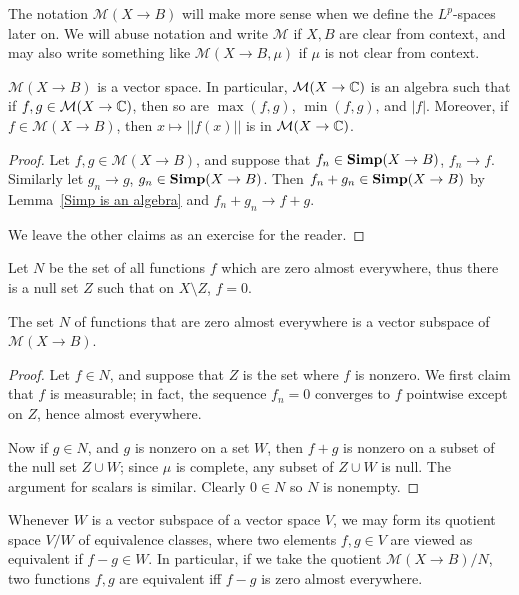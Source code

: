\begin{subsec}
The notation $\mathcal M(X \to B)$ will make more sense when we define the $L^p$-spaces later on.
We will abuse notation and write $\mathcal M$ if $X,B$ are clear from context, and may also write something like $\mathcal M(X \to B, \mu)$ if $\mu$ is not clear from context.
\end{subsec}

\begin{lemma}
$\mathcal M(X \to B)$ is a vector space.
In particular, $\mathcal M(X \to \mathbb{C})$ is an algebra such that if $f, g \in \mathcal M(X \to \mathbb{C})$, then so are $\max(f,g)$, $\min(f,g)$, and $|f|$.
Moreover, if $f \in \mathcal M(X \to B)$, then $x \mapsto ||f(x)||$ is in $\mathcal M(X \to \mathbb{C})$.
\end{lemma}
\begin{proof}
Let $f,g \in \mathcal M(X \to B)$, and suppose that $f_{n} \in \mathbf{Simp}(X \to B)$, $f_{n} \to f$. Similarly let $g_{n} \to g$, $g_{n} \in \mathbf{Simp}(X \to B)$.
Then $f_{n} + g_{n} \in \mathbf{Simp}(X \to B)$ by Lemma~\ref{Simp is an algebra} and $f_{n} + g_{n} \to f + g$.

We leave the other claims as an exercise for the reader.
\end{proof}

\begin{subsec}
Let $N$ be the set of all functions $f$ which are zero almost everywhere, thus there is a null set $Z$ such that on $X \setminus Z$, $f = 0$.
\end{subsec}

\begin{lemma}
The set $N$ of functions that are zero almost everywhere is a vector subspace of $\mathcal M(X \to B)$.
\end{lemma}
\begin{proof}
Let $f \in N$, and suppose that $Z$ is the set where $f$ is nonzero.
We first claim that $f$ is measurable; in fact, the sequence $f_{n} = 0$ converges to $f$ pointwise except on $Z$, hence almost everywhere.

Now if $g \in N$, and $g$ is nonzero on a set $W$, then $f + g$ is nonzero on a subset of the null set $Z \cup W$; since $\mu$ is complete, any subset of $Z \cup W$ is null. The argument for scalars is similar. Clearly $0 \in N$ so $N$ is nonempty.
\end{proof}

\begin{subsec}
Whenever $W$ is a vector subspace of a vector space $V$, we may form its quotient space $V/W$ of equivalence classes, where two elements $f, g \in V$ are viewed as equivalent if $f - g \in W$.
In particular, if we take the quotient $\mathcal M(X \to B)/N$, two functions $f,g$ are equivalent iff $f - g$ is zero almost everywhere.
\end{subsec}

